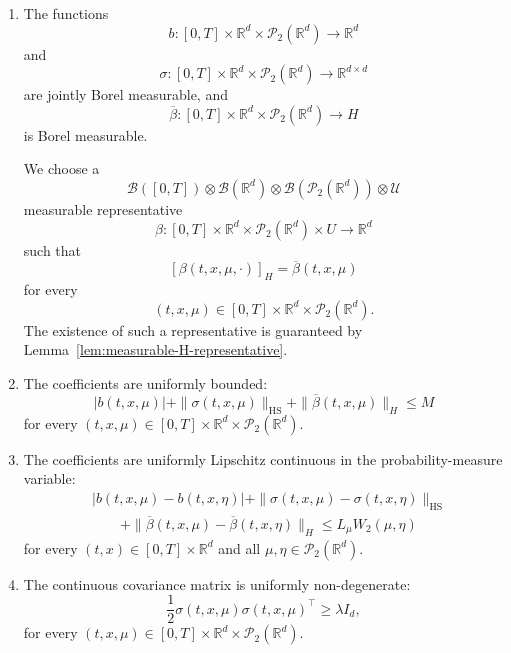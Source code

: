 \documentclass[12pt,oneside, reqno]{amsart}
\numberwithin{equation}{section}
\begin{document}
	\begin{enumerate}
		\item[\textnormal{(A1)}]
		The functions
		\[
		b: [0,T]\times\mathbb R^d \times\mathcal P_2(\mathbb R^d) \longrightarrow \mathbb R^d
		\]
		and
		\[
		\sigma: [0,T]\times\mathbb R^d \times\mathcal P_2(\mathbb R^d) \longrightarrow \mathbb R^{d\times d}
		\]
		are jointly Borel measurable, and
		\[
		\overline\beta: [0,T]\times\mathbb R^d \times\mathcal P_2(\mathbb R^d) \longrightarrow H
		\]
		is Borel measurable.
		
		We choose a
		\[
		\mathcal B([0,T])\otimes\mathcal B(\mathbb R^d)\otimes\mathcal B(\mathcal P_2(\mathbb R^d))\otimes\mathcal U
		\]
		measurable representative
		\[
		\beta: [0,T]\times\mathbb R^d \times\mathcal P_2(\mathbb R^d)\times U \longrightarrow \mathbb R^d
		\]
		such that
		\begin{equation}
			\label{eq:beta-rep}
			[\beta(t,x,\mu,\cdot)]_H = \overline\beta(t,x,\mu)
		\end{equation}
		for every
		\[
		(t,x,\mu)\in [0,T]\times\mathbb R^d \times\mathcal P_2(\mathbb R^d).
		\]
		The existence of such a representative is guaranteed by Lemma~\ref{lem:measurable-H-representative}.
		
		
		
		
		
		\item[\textnormal{(A2)}]
		The coefficients are uniformly bounded:
		\begin{equation}
			\label{eq:uniform-bound-framework}
			|b(t,x,\mu)|+\|\sigma(t,x,\mu)\|_{\mathrm{HS}}+\|\overline\beta(t,x,\mu)\|_H
			\leq M
		\end{equation}
		for every $(t,x,\mu)\in
		[0,T]\times\mathbb R^d\times\mathcal P_2(\mathbb R^d)$.
		
		\item[\textnormal{(A3)}]
		The coefficients are uniformly Lipschitz continuous in the probability-measure
		variable:
		\begin{equation}
			\label{eq:measure-lipschitz-framework}
			\begin{aligned}
				&|b(t,x,\mu)-b(t,x,\eta)|+\|\sigma(t,x,\mu)-\sigma(t,x,\eta)\|_{\mathrm{HS}}
				\\
				&\qquad+\|\overline\beta(t,x,\mu)-\overline\beta(t,x,\eta)\|_H
				\leq L_\mu W_2(\mu,\eta)
			\end{aligned}
		\end{equation}
		for every $(t,x)\in[0,T]\times\mathbb R^d$ and all $\mu,\eta\in\mathcal P_2(\mathbb R^d)$.
		
		\item[\textnormal{(A4)}]
		The continuous covariance matrix is uniformly non-degenerate:
		\begin{equation}
			\label{eq:uniform-ellipticity-framework}
			\frac12\sigma(t,x,\mu)\sigma(t,x,\mu)^\top\geq\lambda I_d,
		\end{equation}
		for every $(t,x,\mu)\in[0,T]\times\mathbb R^d\times\mathcal P_2(\mathbb R^d)$.
	\end{enumerate}
	
\end{document}
